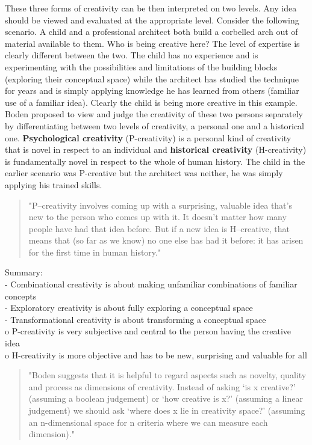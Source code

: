 These three forms of creativity can be then interpreted on two levels. Any idea should be viewed and evaluated at the appropriate level. Consider the following scenario. A child and a professional architect both build a corbelled arch out of material available to them. Who is being creative here? The level of expertise is clearly different between the two. The child has no experience and is experimenting with the possibilities and limitations of the building blocks (exploring their conceptual space) while the architect has studied the technique for years and is simply applying knowledge he has learned from others (familiar use of a familiar idea). Clearly the child is being more creative in this example. Boden proposed to view and judge the creativity of these two persons separately by differentiating between two levels of creativity, a personal one and a historical one. \textbf{Psychological creativity} (P-creativity) is a personal kind of creativity that is novel in respect to an individual and \textbf{historical creativity} (H-creativity) is fundamentally novel in respect to the whole of human history. The child in the earlier scenario was P-creative but the architect was neither, he was simply applying his trained skills.

\begin{quote}
	"P–creativity involves coming up with a surprising, valuable idea that’s new to the person who comes up with it. It doesn’t matter how many people have had that idea before. But if a new idea is H–creative, that means that (so far as we know) no one else has had it before: it has arisen for the first time in human history." \citep{Boden2003}
\end{quote}

\begin{shaded}
  Summary:\\
  -	Combinational creativity is about making unfamiliar combinations of familiar concepts\\
  -	Exploratory creativity is about fully exploring a conceptual space\\
  -	Transformational creativity is about transforming a conceptual space\\
  o	P-creativity is very subjective and central to the person having the creative idea\\
  o	H-creativity is more objective and has to be new, surprising and valuable for all
\end{shaded}

\begin{quote}
  "Boden suggests that it is helpful to regard aspects such as novelty, quality and process as dimensions of creativity. Instead of asking ‘is x creative?’ (assuming a boolean judgement) or ‘how creative is x?’ (assuming a linear judgement) we should ask ‘where does x lie in creativity space?’ (assuming an n-dimensional space for n criteria where we can measure each dimension)." \citep[p.8]{Pease2001}
\end{quote}

